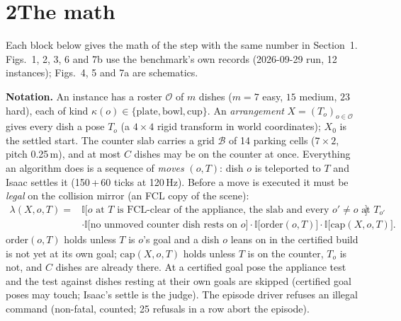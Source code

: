 \documentclass[10pt]{article}
\newcommand{\Obj}{\mathcal{O}}
\newcommand{\Buf}{\mathcal{B}}
\newcommand{\ind}{\mathbb{I}}
\newcommand{\legal}{\lambda}
\newcommand{\head}[1]{\par\smallskip\textbf{#1}\quad}
\begin{document}
\small
\setlength{\abovedisplayskip}{3pt}\setlength{\belowdisplayskip}{3pt}
\section*{2\quad The math}
Each block below gives the math of the step with the same number in Section~1.
Figs.~1, 2, 3, 6 and 7b use the benchmark's own records (2026-09-29 run, 12 instances); Figs.~4, 5 and 7a are schematics.

\head{Notation.}
An instance has a roster $\Obj$ of $m$ dishes ($m=7$ easy, $15$ medium, $23$ hard), each of kind $\kappa(o)\in\{\text{plate},\text{bowl},\text{cup}\}$.
An \emph{arrangement} $X=(T_o)_{o\in\Obj}$ gives every dish a pose $T_o$ (a $4\times4$ rigid transform in world coordinates); $X_0$ is the settled start.
The counter slab carries a grid $\Buf$ of 14 parking cells ($7\times2$, pitch 0.25\,m), and at most $C$ dishes may be on the counter at once.
Everything an algorithm does is a sequence of \emph{moves} $(o,T)$: dish $o$ is teleported to $T$ and Isaac settles it (150\,+\,60 ticks at 120\,Hz).
Before a move is executed it must be \emph{legal} on the collision mirror (an FCL copy of the scene):
\begin{equation}
\begin{aligned}
\legal(X,o,T)={}&\ind\bigl[\text{$o$ at $T$ is FCL-clear of the appliance, the slab and every $o'\neq o$ at $T_{o'}$}\bigr]\\
&\cdot\ind\bigl[\text{no unmoved counter dish rests on $o$}\bigr]\cdot\ind\bigl[\text{order}(o,T)\bigr]\cdot\ind\bigl[\text{cap}(X,o,T)\bigr].
\end{aligned}
\label{eq:legal}
\end{equation}
$\text{order}(o,T)$ holds unless $T$ is $o$'s goal and a dish $o$ leans on in the certified build is not yet at its own goal; $\text{cap}(X,o,T)$ holds unless $T$ is on the counter, $T_o$ is not, and $C$ dishes are already there.
At a certified goal pose the appliance test and the test against dishes resting at their own goals are skipped (certified goal poses may touch; Isaac's settle is the judge).
The episode driver refuses an illegal command (non-fatal, counted; 25 refusals in a row abort the episode).
\end{document}
